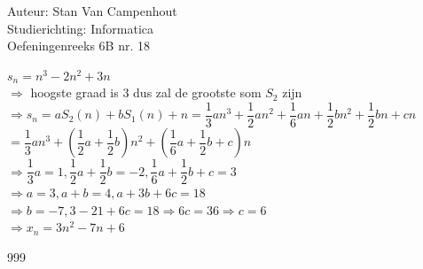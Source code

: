 \documentclass[a4paper]{article}
\begin{document}
  
\noindent \large Auteur: Stan Van Campenhout \\
\noindent \large Studierichting:  Informatica\\
\noindent \large Oefeningenreeks 6B nr. 18\\

\medskip

\normalsize

$ s_n = n^3 - 2n^2 + 3n $\\

$ \Rightarrow $ hoogste graad is 3 dus zal de grootste som $ S_2 $ zijn \\

$ \Rightarrow s_n = aS_2(n) + bS_1(n) + n = \dfrac{1}{3}an^3+\dfrac{1}{2}an^2+\dfrac{1}{6}an+\dfrac{1}{2}bn^2 + \dfrac{1}{2}bn+cn $\\

$ = \dfrac{1}{3}an^3 + \left(\dfrac{1}{2}a+\dfrac{1}{2}b\right)n^2 + \left(\dfrac{1}{6}a + \dfrac{1}{2}b + c\right)n $\\

$ \Rightarrow \dfrac{1}{3}a = 1, \dfrac{1}{2}a + \dfrac{1}{2}b = -2, \dfrac{1}{6}a +\dfrac{1}{2}b + c = 3 $\\

$ \Rightarrow a = 3, a + b = 4, a + 3b + 6c = 18 $\\

$ \Rightarrow b = -7, 3 - 21 +6c = 18 \Rightarrow 6c = 36 \Rightarrow c = 6 $\\

$ \Rightarrow x_n = 3n^2 -7n + 6 $\\

\begin{thebibliography}{999}
\end{thebibliography}
\end{document}
